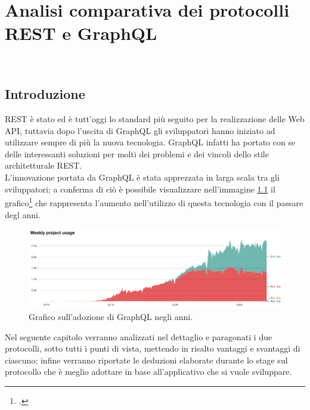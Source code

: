 
\chapter{Analisi comparativa dei protocolli REST e GraphQL}
\label{analisi-comparativa}
\\
\section{Introduzione}
REST è stato ed è tutt'oggi lo standard più seguito per la realizzazione delle Web API, tuttavia dopo l'uscita di GraphQL gli sviluppatori hanno iniziato ad utilizzare sempre di più la nuova tecnologia. GraphQL infatti ha portato con se delle interessanti soluzioni per molti dei problemi e dei vincoli dello stile architetturale REST.\\
L'innovazione portata da GraphQL è stata apprezzata in larga scala tra gli sviluppatori; a conferma di ciò è possibile visualizzare nell'immagine \ref{graphQL-usage-chart} il grafico\footcite{Fonte: https://www.drupal.org/project/usage/graphql} che rappresenta l'aumento nell'utilizzo di questa tecnologia con il passare degl anni. 
\FloatBarrier
\begin{figure}[!ht]
\centering
\includegraphics[width=1\linewidth]{immagini/GraphQLUsageChart.png}
\caption{Grafico sull'adozione di GraphQL negli anni.}
\label{graphQL-usage-chart}
\end{figure}
\FloatBarrier
Nel seguente capitolo verranno analizzati nel dettaglio e paragonati i due protocolli, sotto tutti i punti di vista, mettendo in risalto vantaggi e svantaggi di ciascuno; infine verranno riportate le deduzioni elaborate durante lo stage sul protocollo che è meglio adottare in base all'applicativo che si vuole sviluppare.
